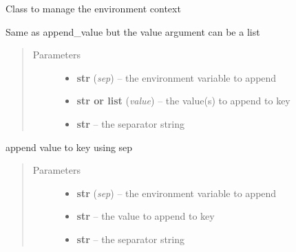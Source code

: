 \documentclass[a4paper,10pt,english]{sphinxmanual}
\begin{document}
\begin{fulllineitems}
\label{commands/apidoc/src:src.environment.Environ}
Class to manage the environment context

\begin{fulllineitems}
\label{commands/apidoc/src:src.environment.Environ.append}
Same as append\_value but the value argument can be a list
\begin{quote}\begin{description}
\item[{Parameters}] \leavevmode\begin{itemize}
\item {} 
\textbf{str} (\emph{sep}) -- the environment variable to append

\item {} 
\textbf{str or list} (\emph{value}) -- the value(s) to append to key

\item {} 
\textbf{str} -- the separator string

\end{itemize}

\end{description}\end{quote}

\end{fulllineitems}


\begin{fulllineitems}
\label{commands/apidoc/src:src.environment.Environ.append_value}
append value to key using sep
\begin{quote}\begin{description}
\item[{Parameters}] \leavevmode\begin{itemize}
\item {} 
\textbf{str} (\emph{sep}) -- the environment variable to append

\item {} 
\textbf{str} -- the value to append to key

\item {} 
\textbf{str} -- the separator string


\end{itemize}
\end{description}
\end{quote}
\end{fulllineitems}
\end{fulllineitems}
\end{document}
